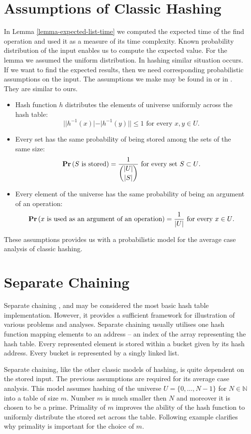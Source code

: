 \section{Assumptions of Classic Hashing}
In Lemma \ref{lemma-expected-list-time} we computed the expected time of the find operation and used it as a measure of its time complexity. Known probability distribution of the input enables us to compute the expected value. For the lemma we assumed the uniform distribution. In hashing similar situation occurs. If we want to find the expected results, then we need corresponding probabilistic assumptions on the input. The assumptions we make may be found in \cite{VK-skripta} or in \cite{DBLP:books/sp/Mehlhorn84}. They are similar to ours.
\begin{itemize}
\item Hash function $h$ distributes the elements of universe uniformly across the hash table:
\[
||h^{-1}(x)| - |h^{-1}(y)|| \leq 1 \text{ for every }x, y \in U \text{.}
\]
\item Every set has the same probability of being stored among the sets of the same size:
\[
\mathbf{Pr}\left(S \text{ is stored}\right) = \frac{1}{\dbinom{|U|}{|S|}} \text{ for every set } S \subset U \text{.}
\]
\item Every element of the universe has the same probability of being an argument of an operation:
\[
\mathbf{Pr}\left(x \text{ is used as an argument of an operation}\right) = \frac{1}{|U|} \text{ for every } x \in U \text{.}
\]
\end{itemize}

These assumptions provides us with a probabilistic model for the average case analysis of classic hashing.

\section{Separate Chaining}
Separate chaining \cite{The-art-of-computer-programming}, \cite{DBLP:books/sp/Mehlhorn84} and \cite{DBLP:books/sp/MehlhornS2008} may be considered the most basic hash table implementation. However, it provides a sufficient framework for illustration of various problems and analyses. Separate chaining usually utilises one hash function mapping elements to an address -- an index of the array representing the hash table. Every represented element is stored within a bucket given by its hash address. Every bucket is represented by a singly linked list. 

Separate chaining, like the other classic models of hashing, is quite dependent on the stored input. The previous assumptions are required for its average case analysis. This model assumes hashing of the universe $U = \{0, \dots, N - 1\}$ for $N \in \mathbb{N}$ into a table of size $m$. Number $m$ is much smaller then $N$ and moreover it is chosen to be a prime. Primality of $m$ improves the ability of the hash function to uniformly distribute the stored set across the table.  Following example clarifies why primality is important for the choice of $m$.

